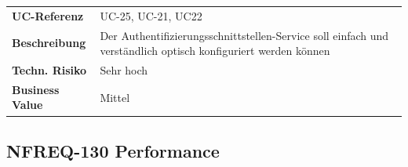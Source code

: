 \begin{longtable}[c]{@{}ll@{}}
\toprule
\begin{minipage}[t]{0.20\columnwidth}\raggedright\strut
\textbf{UC-Referenz}
\strut\end{minipage} &
\begin{minipage}[t]{0.74\columnwidth}\raggedright\strut
UC-25, UC-21, UC22
\strut\end{minipage}\tabularnewline
\begin{minipage}[t]{0.20\columnwidth}\raggedright\strut
\textbf{Beschreibung}
\strut\end{minipage} &
\begin{minipage}[t]{0.74\columnwidth}\raggedright\strut
Der Authentifizierungsschnittstellen-Service soll einfach und
verständlich optisch konfiguriert werden können
\strut\end{minipage}\tabularnewline
\begin{minipage}[t]{0.20\columnwidth}\raggedright\strut
\textbf{Techn. Risiko}
\strut\end{minipage} &
\begin{minipage}[t]{0.74\columnwidth}\raggedright\strut
Sehr hoch
\strut\end{minipage}\tabularnewline
\begin{minipage}[t]{0.20\columnwidth}\raggedright\strut
\textbf{Business Value}
\strut\end{minipage} &
\begin{minipage}[t]{0.74\columnwidth}\raggedright\strut
Mittel
\strut\end{minipage}\tabularnewline
\bottomrule
\end{longtable}

\subsection{NFREQ-130 Performance}\label{nfreq-130-performance}


